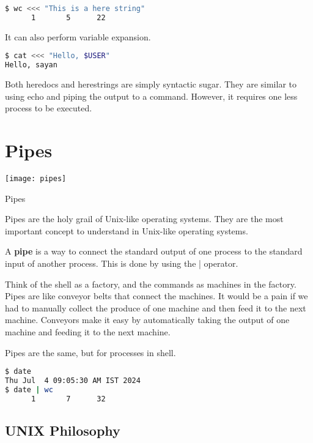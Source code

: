 \begin{lstlisting}[language=bash]
$ wc <<< "This is a here string"
      1       5      22
\end{lstlisting}

It can also perform variable expansion.

\begin{lstlisting}[language=bash]
$ cat <<< "Hello, $USER"
Hello, sayan
\end{lstlisting}

\begin{remark}
  Both heredocs and herestrings are simply syntactic sugar. They are
  similar to using echo and piping the output to a command. However,
  it requires one less process to be executed.
\end{remark}

\section{Pipes}

\begin{marginfigure}
  \texttt{[image: pipes]}
  \caption{Pipes}
\end{marginfigure}

Pipes are the holy grail of Unix-like operating systems.
They are the most important concept to understand
in Unix-like operating systems.

\begin{definition}[Pipe]
  A \textbf{pipe} is a way to connect the standard output of one process
  to the standard input of another process. This is done by using the
  \lstinline||| operator.
\end{definition}

Think of the shell as a factory, and the commands as machines in the
factory. Pipes are like conveyor belts that connect the machines.
It would be a pain if we had to manually collect the produce of one
machine and then feed it to the next machine. Conveyors make it easy
by automatically taking the output of one machine and feeding it to
the next machine.

Pipes are the same, but for processes in shell.

\begin{lstlisting}[language=bash]
$ date
Thu Jul  4 09:05:30 AM IST 2024
$ date | wc
      1       7      32
\end{lstlisting}

\subsection{UNIX Philosophy}


